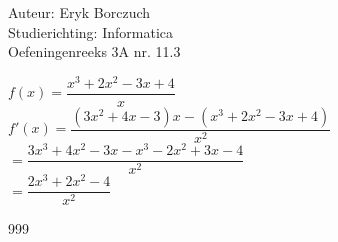 \documentclass[a4paper]{article}
\begin{document}
  
\noindent \large Auteur: Eryk Borczuch \\
\noindent \large Studierichting: Informatica\\
\noindent \large Oefeningenreeks 3A nr. 11.3\\

\medskip

\normalsize

$f(x) = \dfrac{x^3 +2x^2 -3x +4}{x}$\\

$f'(x) = \dfrac{(3x^2 +4x -3)x - (x^3+2x^2 -3x +4)}{x^2}$\\

$ = \dfrac{3x^3 +4x^2 -3x -x^3 -2x^2 +3x -4}{x^2}$\\

$= \dfrac{2x^3+2x^2-4}{x^2}$\\

\begin{thebibliography}{999}
\end{thebibliography}
\end{document}
